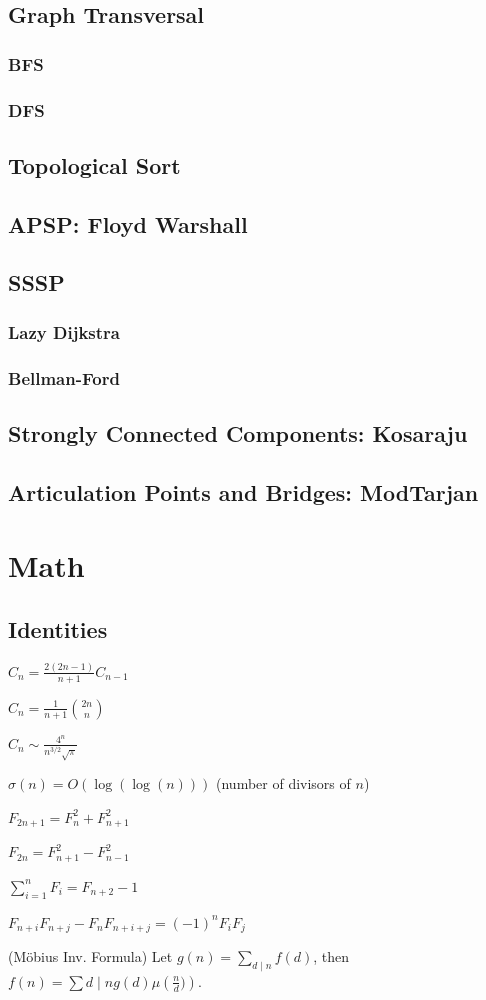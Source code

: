 \subsection{Graph Transversal}
\subsubsection{BFS}
\subsubsection{DFS}
\subsection{Topological Sort}
\subsection{APSP: Floyd Warshall}
\subsection{SSSP}
\subsubsection{Lazy Dijkstra}
\subsubsection{Bellman-Ford}
\subsection{Strongly Connected Components: Kosaraju}
\subsection{Articulation Points and Bridges: ModTarjan}

\section{Math}
\subsection{Identities}
{
$C_n = \frac{2(2n-1)}{n+1} C_{n-1}$

$C_n = \frac{1}{n+1} \binom{2n}{n}$

$C_n \sim \frac{4^n}{n^{3/2}\sqrt{\pi}}$

$\sigma(n) = O(\log(\log(n)))$ (number of divisors of $n$)

$F_{2n+1} = F_{n}^2 + F_{n+1}^2$

$F_{2n} = F_{n+1}^2 - F_{n-1}^2$

$\sum_{i=1}^n F_i = F_{n+2}-1$

$F_{n+i}F_{n+j} - F_nF_{n+i+j} = (-1)^n F_iF_j$

(Möbius Inv. Formula)
Let $g(n) = \sum_{d\mid n} f(d)$, then $f(n)=\sum{d\mid n} g(d) \mu\left(\frac{n}{d})\right)$.
}
